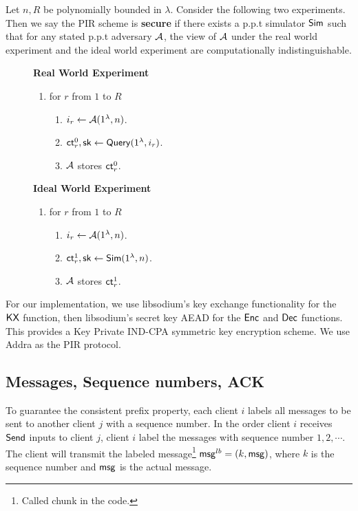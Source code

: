\begin{definition}
\label{defn:pir-security}
Let $n, R$ be polynomially bounded in $\lambda$. Consider the following two experiments. Then we say the PIR scheme is \textbf{secure} if there exists a p.p.t simulator $\mathsf{Sim}$ such that for any stated p.p.t adversary $\mathcal{A}$, the view of $\mathcal{A}$ under the real world experiment and the ideal world experiment are computationally indistinguishable. 

\begin{figure}[h!]
\begin{framed}
\textbf{Real World Experiment}
\begin{enumerate}
    \item for $r$ from $1$ to $R$
    \begin{enumerate}
        \item $i_r \leftarrow \mathcal{A}(1^{\lambda}, n)$.
        \item $\mathsf{ct}_r^0, {\mathsf{sk}} \leftarrow \mathsf{Query}(1^{\lambda}, i_r)$.
        \item $\mathcal{A}$ stores $\mathsf{ct}_r^0$.
    \end{enumerate}
\end{enumerate}
\textbf{Ideal World Experiment}
\begin{enumerate}
    \item for $r$ from $1$ to $R$
    \begin{enumerate}
        \item $i_r \leftarrow \mathcal{A}(1^{\lambda}, n)$.
        \item $\mathsf{ct}_r^1, {\mathsf{sk}} \leftarrow \mathsf{Sim}(1^{\lambda}, n)$.
        \item $\mathcal{A}$ stores $\mathsf{ct}_r^1$.
    \end{enumerate}
\end{enumerate}
\end{framed}
\end{figure}
\end{definition}
For our implementation, we use libsodium's key exchange functionality for the $\mathsf{KX}$ function, then libsodium's secret key AEAD for the $\mathsf{Enc}$ and $\mathsf{Dec}$ functions. This provides a Key Private IND-CPA symmetric key encryption scheme. We use Addra as the PIR protocol.
\subsection{Messages, Sequence numbers, ACK}
To guarantee the consistent prefix property, each client $i$ labels all messages to be sent to another client $j$ with a sequence number. In the order client $i$ receives $\mathsf{Send}$ inputs to client $j$, client $i$ label the messages with sequence number $1,2,\cdots$. The client will transmit the labeled message\footnote{Called chunk in the code.} $\mathsf{msg}^{lb} = (k, \mathsf{msg})$, where $k$ is the sequence number and $\mathsf{msg}$ is the actual message. 

